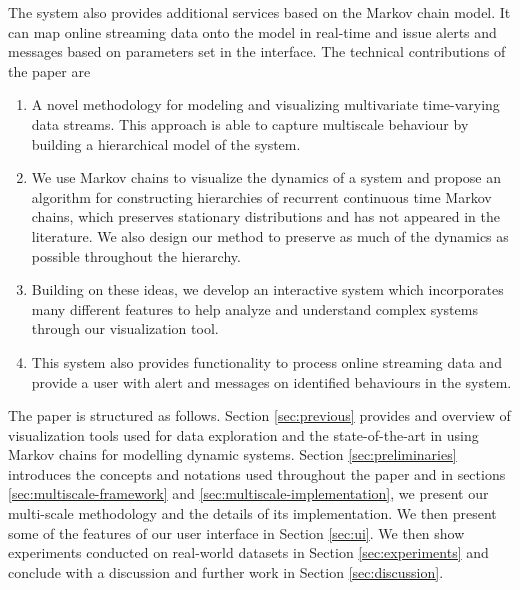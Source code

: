 The system also provides additional services based on the Markov chain model. It can map online streaming data onto 
the model in real-time and issue alerts and messages based on parameters set in the interface. %
%
The technical contributions of the paper are
\begin{enumerate}{}
  \item A novel methodology for modeling and visualizing multivariate time-varying data streams. This approach is able to capture multiscale behaviour by building a hierarchical model of the system.
  \item We use Markov chains to visualize the dynamics of a system and propose an algorithm for constructing hierarchies of recurrent continuous time Markov chains, which preserves stationary distributions and has not appeared in the literature. We also design our method to preserve as much of the dynamics as possible throughout the hierarchy.
  \item Building on these ideas, we develop an interactive system which incorporates many different features to help analyze and understand complex systems through our visualization tool.
  \item This system also provides functionality to process online streaming data and provide a user with  alert and messages on identified behaviours in the system.  
\end{enumerate}

The paper is structured as follows. Section \ref{sec:previous} provides and overview
of visualization tools used for data exploration and the state-of-the-art in using Markov chains for modelling dynamic systems.
Section \ref{sec:preliminaries} introduces the concepts and notations used throughout the paper and 
in sections \ref{sec:multiscale-framework} and \ref{sec:multiscale-implementation}, we present
our multi-scale methodology and the details of its implementation. We then present some of the 
features of our user interface in Section \ref{sec:ui}. We then show experiments conducted on real-world datasets in Section \ref{sec:experiments} and conclude with a discussion and further work in Section \ref{sec:discussion}.

